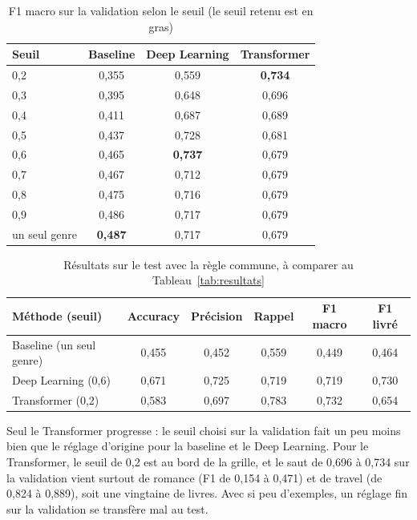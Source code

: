 \documentclass[11pt,a4paper]{article}
\begin{document}
\begin{table}[H]
\centering
\caption{F1 macro sur la validation selon le seuil (le seuil retenu est en gras)}
\label{tab:grille}
\small
\begin{tabular}{l c c c}
\toprule
\textbf{Seuil} & \textbf{Baseline} & \textbf{Deep Learning} & \textbf{Transformer} \\
\midrule
0,2 & 0,355 & 0,559 & \textbf{0,734} \\
0,3 & 0,395 & 0,648 & 0,696 \\
0,4 & 0,411 & 0,687 & 0,689 \\
0,5 & 0,437 & 0,728 & 0,681 \\
0,6 & 0,465 & \textbf{0,737} & 0,679 \\
0,7 & 0,467 & 0,712 & 0,679 \\
0,8 & 0,475 & 0,716 & 0,679 \\
0,9 & 0,486 & 0,717 & 0,679 \\
un seul genre & \textbf{0,487} & 0,717 & 0,679 \\
\bottomrule
\end{tabular}
\end{table}

\begin{table}[H]
\centering
\caption{Résultats sur le test avec la règle commune, à comparer au Tableau~\ref{tab:resultats}}
\label{tab:regle}
\small
\begin{tabular}{l c c c c c}
\toprule
\textbf{Méthode (seuil)} & \textbf{Accuracy} & \textbf{Précision} & \textbf{Rappel} & \textbf{F1 macro} & \textbf{F1 livré} \\
\midrule
Baseline (un seul genre) & 0,455 & 0,452 & 0,559 & 0,449 & 0,464 \\
Deep Learning (0,6)      & 0,671 & 0,725 & 0,719 & 0,719 & 0,730 \\
Transformer (0,2)        & 0,583 & 0,697 & 0,783 & 0,732 & 0,654 \\
\bottomrule
\end{tabular}
\end{table}

Seul le Transformer progresse : le seuil choisi sur la validation fait un peu moins bien que le réglage d'origine pour la baseline et le Deep Learning. Pour le Transformer, le seuil de 0,2 est au bord de la grille, et le saut de 0,696 à 0,734 sur la validation vient surtout de romance (F1 de 0,154 à 0,471) et de travel (de 0,824 à 0,889), soit une vingtaine de livres. Avec si peu d'exemples, un réglage fin sur la validation se transfère mal au test.
\end{document}
